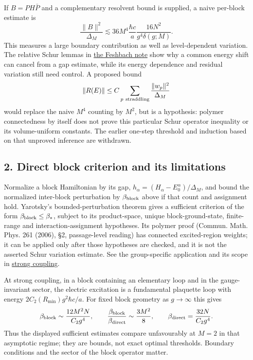 \documentclass[11pt,a4paper]{article}
\begin{document}
If \(B=PH\bar P\) and a complementary resolvent bound is supplied, a
naive per-block estimate is \[\frac{\|B\|^2}{\Delta_M}\lesssim
36M^4\frac{\hbar c}{a}\frac{16N^2}{g^4\delta(g;M)}.\] This measures a
large boundary contribution as well as level-dependent variation. The
relative Schur lemmas in \href{weak-coupling-feshbach-reduction.md}{the
Feshbach note} show why a common energy shift can cancel from a gap
estimate, while its energy dependence and residual variation still need
control. A proposed bound \[\|R(E)\|\le C\sum_{p\ {\rm straddling}}
\frac{\|w_p\|^2}{\Delta_M}\] would replace the naive \(M^4\) counting by
\(M^2\), but is a hypothesis: polymer connectedness by itself does not
prove this particular Schur operator inequality or its volume-uniform
constants. The earlier one-step threshold and induction based on that
unproved inference are withdrawn.

\hypertarget{direct-block-criterion-and-its-limitations}{%
\subsection{2. Direct block criterion and its
limitations}\label{direct-block-criterion-and-its-limitations}}

Normalize a block Hamiltonian by its gap,
\(h_\alpha=(H_\alpha-E_0^\alpha)/\Delta_M\), and bound the normalized
inter-block perturbation by \(\beta_{\rm block}\) above if that count
and assignment hold. Yarotsky's bounded-perturbation theorem gives a
sufficient criterion of the form \(\beta_{\rm block}\le\beta_*\),
subject to its product-space, unique block-ground-state, finite-range
and interaction-assignment hypotheses. Its polymer proof (Commun. Math.
Phys. 261 (2006), §2, passage-level reading) has connected
excited-region weights; it can be applied only after those hypotheses
are checked, and it is not the asserted Schur variation estimate. See
the group-specific application and its scope in
\href{strong-coupling-uniform-gap.md}{strong coupling}.

At strong coupling, in a block containing an elementary loop and in the
gauge-invariant sector, the electric excitation is a fundamental
plaquette loop with energy \(2C_2(R_{\min})g^2\hbar c/a\). For fixed
block geometry as \(g\to\infty\) this gives
\[\beta_{\rm block}\sim\frac{12M^2N}{C_2g^4},\qquad
\frac{\beta_{\rm block}}{\beta_{\rm direct}}\sim\frac{3M^2}{8},\qquad
\beta_{\rm direct}=\frac{32N}{C_2g^4}.\] Thus the displayed sufficient
estimates compare unfavourably at \(M=2\) in that asymptotic regime;
they are bounds, not exact optimal thresholds. Boundary conditions and
the sector of the block operator matter.
\end{document}
